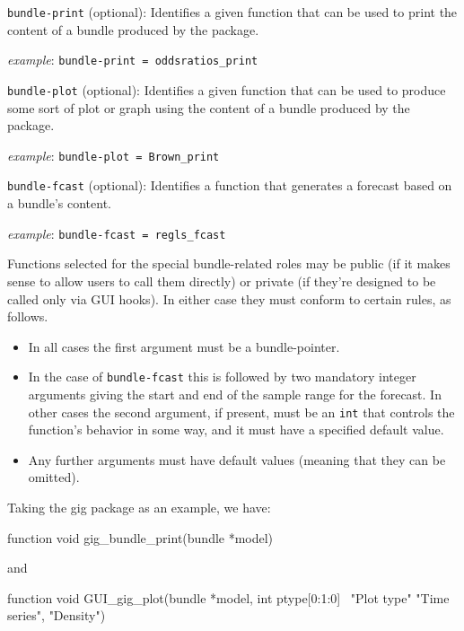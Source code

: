 \documentclass[oneside]{book}
\newcommand{\vbusage}[0]{\textit{example}: \quad}
\begin{document}
\begin{description}

\item \texttt{bundle-print} (optional): Identifies a given function that can
  be used to print the content of a bundle produced by the package.

  \vbusage{} \verb|bundle-print = oddsratios_print|

\item \texttt{bundle-plot} (optional): Identifies a given function that can
  be used to produce some sort of plot or graph using the content of a
  bundle produced by the package.

  \vbusage{} \verb|bundle-plot = Brown_print|

\item \texttt{bundle-fcast} (optional): Identifies a function that
  generates a forecast based on a bundle's content.

  \vbusage{} \verb|bundle-fcast = regls_fcast|

\end{description}

Functions selected for the special bundle-related roles may be public (if it
makes sense to allow users to call them directly) or private (if they're
designed to be called only via GUI hooks). In either case they must conform
to certain rules, as follows.
\begin{itemize}
\item In all cases the first argument must be a bundle-pointer.
\item In the case of \texttt{bundle-fcast} this is followed by two
  mandatory integer arguments giving the start and end of the sample
  range for the forecast. In other cases the second argument, if
  present, must be an \texttt{int} that controls the function's
  behavior in some way, and it must have a specified default value.
\item Any further arguments must have default values (meaning that
  they can be omitted).
\end{itemize}

Taking the \textsf{gig} package as an example, we have:
%
\begin{code}
  function void gig_bundle_print(bundle *model)
\end{code}
%
and
%
\begin{code}
  function void GUI_gig_plot(bundle *model, int ptype[0:1:0] \
                             "Plot type" {"Time series", "Density"})
\end{code}
\end{document}
